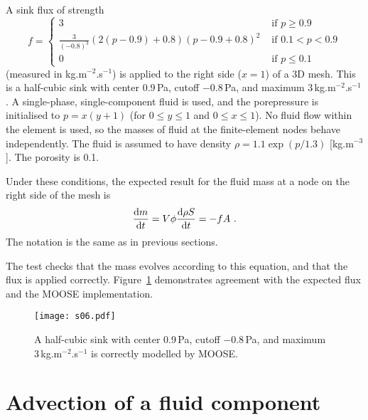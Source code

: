 A sink flux of strength
\begin{equation}
f = \left\{
\begin{array}{ll}
3 & \mbox{ if } p \geq 0.9 \\
\frac{3}{(-0.8)^3} (2(p-0.9) + 0.8) (p - 0.9 + 0.8)^2 & \mbox{ if }
0.1 < p < 0.9 \\
0 & \mbox{ if } p \leq 0.1
\end{array}
\right.
\end{equation}
(measured in kg.m$^{-2}$.s$^{-1}$) is applied to the right side
($x=1$) of a 3D mesh.  This is a half-cubic sink with center
0.9\,Pa, cutoff $-0.8$\,Pa, and maximum 3\,kg.m$^{-2}$.s$^{-1}$.  A
single-phase, single-component fluid is used, and the porepressure is
initialised to $p=x(y+1)$ (for $0\leq y \leq 1$ and $0\leq x \leq 1$).
No fluid flow within the element is used, so the masses of fluid at
the finite-element nodes behave independently.  The fluid is assumed
to have density $\rho = 1.1 \exp(p/1.3)$ [kg.m$^{-3}$].  The porosity
is 0.1.

Under these conditions, the expected result for the fluid mass at a
node on the right side of the mesh is
\begin{equation}
\frac{\mathrm{d} m}{\mathrm{d} t} = V\phi \frac{\mathrm{d} \rho S}{\mathrm{d} t} = -f A \ .
\end{equation}
The notation is the same as in previous sections.

The test checks that the mass evolves according to this equation, and
that the flux is applied correctly.  Figure~\ref{s06.fig} demonstrates
agreement with the expected flux and the MOOSE implementation.

\begin{figure}[htb]
\begin{center}
\texttt{[image: s06.pdf]}
\caption{A half-cubic sink with center 0.9\,Pa, cutoff $-0.8$\,Pa, and
  maximum 3\,kg.m$^{-2}$.s$^{-1}$ is correctly modelled by MOOSE.}
\label{s06.fig}
\end{center}
\end{figure}


\chapter{Advection of a fluid component}

